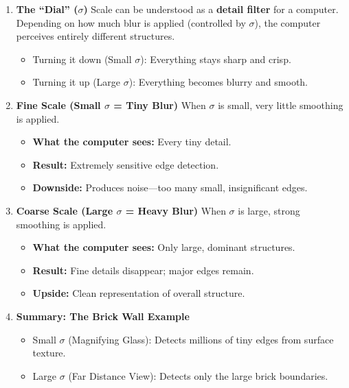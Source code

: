 \documentclass[12pt]{article}
\begin{document}
\begin{enumerate}
    \item \textbf{The ``Dial'' ($\sigma$)}
          Scale can be understood as a \textbf{detail filter} for a computer. Depending on how much blur is applied (controlled by $\sigma$), the computer perceives entirely different structures.
          \begin{itemize}
              \item Turning it down (Small $\sigma$): Everything stays sharp and crisp.
              \item Turning it up (Large $\sigma$): Everything becomes blurry and smooth.
          \end{itemize}

    \item \textbf{Fine Scale (Small $\sigma$ = Tiny Blur)}
          When $\sigma$ is small, very little smoothing is applied.
          \begin{itemize}
              \item \textbf{What the computer sees:} Every tiny detail.
              \item \textbf{Result:} Extremely sensitive edge detection.
              \item \textbf{Downside:} Produces noise—too many small, insignificant edges.
          \end{itemize}

    \item \textbf{Coarse Scale (Large $\sigma$ = Heavy Blur)}
          When $\sigma$ is large, strong smoothing is applied.
          \begin{itemize}
              \item \textbf{What the computer sees:} Only large, dominant structures.
              \item \textbf{Result:} Fine details disappear; major edges remain.
              \item \textbf{Upside:} Clean representation of overall structure.
          \end{itemize}

    \item \textbf{Summary: The Brick Wall Example}
          \begin{itemize}
              \item Small $\sigma$ (Magnifying Glass): Detects millions of tiny edges from surface texture.
              \item Large $\sigma$ (Far Distance View): Detects only the large brick boundaries.
          \end{itemize}
\end{enumerate}
\end{document}
